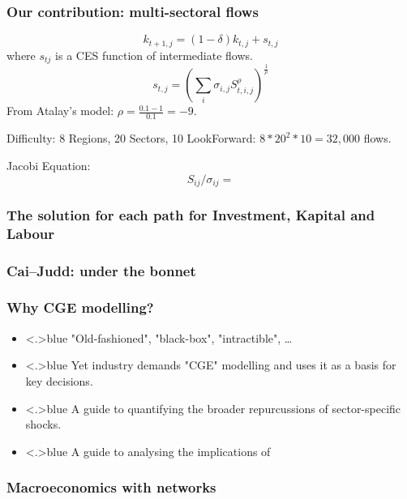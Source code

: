 \documentclass[handout,english]{beamer}
\begin{document}
\begin{frame}
  \frametitle{Our contribution: multi-sectoral flows}
  \[
    k_{t + 1, j} = (1 - \delta) k_{t, j} + s_{t, j}
  \]
  where $s_{tj}$ is a CES function of intermediate flows.
  \[
    s_{t, j} = \left(\sum_{i} \sigma_{i, j} S_{t, i, j} ^ {\rho} \right)
      ^ {\frac{1}{\rho}}
  \]
  From Atalay's model: $\rho = \frac{0.1 - 1}{0.1} = -9$.

  Difficulty: 8 Regions, 20 Sectors, 10 LookForward: $8 * 20^2 * 10 = 32,000$ flows.

  Jacobi Equation:
    \[
      S_{ij} / \sigma_{ij} = 
    \]
\end{frame}
\begin{frame}
  \frametitle{The solution for each path for Investment, Kapital and Labour}
  

\end{frame}

\begin{frame}
  \frametitle{Cai--Judd: under the bonnet}
  

\end{frame}

\begin{frame}
  \frametitle{Why CGE modelling?}

  \begin{itemize}
    \item<+-|alert@+>{\color<.>{blue}
      "Old-fashioned", "black-box", "intractible", \dots
    }
    \item<+-|alert@+>{\color<.>{blue}
      Yet industry demands "CGE" modelling and uses it as a basis for key 
      decisions.
    }
    \item<+-|alert@+>{\color<.>{blue}
      A guide to quantifying the broader repurcussions of sector-specific
      shocks.
    }
    \item<+-|alert@+>{\color<.>{blue}
      A guide to analysing the implications of 
    }
  \end{itemize}
\vfill
\end{frame}
\begin{frame}
\frametitle{Macroeconomics with networks}

\end{frame}
\end{document}
